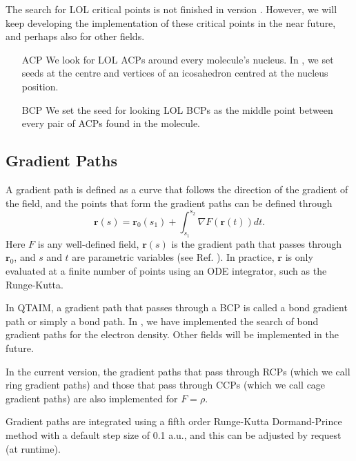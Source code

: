 The search for LOL critical points is not finished in version \dtkversion. However, we will keep developing the implementation of these critical points in the near future, and perhaps also for other fields.

\begin{itemize}
\item[ACP] We look for LOL ACPs around every molecule's nucleus. In \DTK{} \dtkversion,
  we set seeds at the centre and vertices of an icosahedron centred at the nucleus position.
\item[BCP] We set the seed for looking LOL BCPs as the middle point between every pair of ACPs found in the molecule.
\end{itemize}

\subsection{Gradient Paths}\label{sec:gradpaths}

A gradient path is defined as a curve that follows the direction of the gradient of the field, and the points that form the gradient paths can be defined through
%
\begin{equation}
   \boldsymbol{r}(s)=\boldsymbol{r}_0(s_1)+\int_{s_1}^{s_2}\nabla F(\boldsymbol{r}(t))dt.
\end{equation}
%
Here $F$ is any well-defined field, $\boldsymbol{r}(s)$ is the gradient path that passes through $\boldsymbol{r}_0$, and $s$ and $t$ are parametric variables (see Ref. \cite{bib:bader1990book}). In practice, $\boldsymbol{r}$ is only
evaluated at a finite number of points using an ODE integrator, such as the Runge-Kutta.

In QTAIM, a gradient path that passes through a BCP is called a bond gradient path or simply a bond path. In \DTK{} \dtkversion, we have implemented the search of bond gradient paths for the electron density. Other fields will be implemented in the future.

In the current version, the gradient paths that pass through RCPs (which we call ring gradient paths) and those
that pass through CCPs (which we call cage gradient paths) are also implemented for $F=\rho$.

Gradient paths are integrated using a fifth order Runge-Kutta Dormand-Prince method with a
default step size of 0.1 a.u., and this can be adjusted by request (at runtime).


